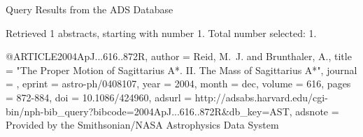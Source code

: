 Query Results from the ADS Database


Retrieved 1 abstracts, starting with number 1.  Total number selected: 1.

@ARTICLE{2004ApJ...616..872R,
   author = {{Reid}, M.~J. and {Brunthaler}, A.},
    title = "{The Proper Motion of Sagittarius A*. II. The Mass of Sagittarius A*}",
  journal = {\apj},
   eprint = {astro-ph/0408107},
     year = 2004,
    month = dec,
   volume = 616,
    pages = {872-884},
      doi = {10.1086/424960},
   adsurl = {http://adsabs.harvard.edu/cgi-bin/nph-bib_query?bibcode=2004ApJ...616..872R&db_key=AST},
  adsnote = {Provided by the Smithsonian/NASA Astrophysics Data System}
}


